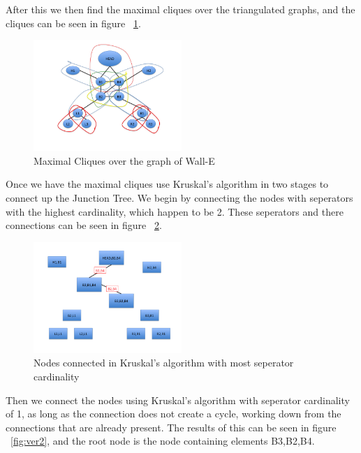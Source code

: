 \documentclass[paper=a4, fontsize=11pt]{scrartcl} %
\begin{document}
After this we then find the maximal cliques over the triangulated graphs, and the cliques can be seen in figure ~\ref{fig:clique}.

\begin{figure}
\centering
\includegraphics[width=0.5\textwidth]{Problem3/Slide3.png}
\caption{Maximal Cliques over the graph of Wall-E}
\label{fig:clique}
\end{figure}

Once we have the maximal cliques use Kruskal's algorithm in two stages to connect up the Junction Tree.  
We begin by connecting the nodes with seperators with the highest cardinality, which happen to be 2.
These seperators and there connections can be seen in figure ~\ref{fig:ver1}.

\begin{figure}
\centering
\includegraphics[width=0.5\textwidth]{Problem3/Slide4.png}
\caption{Nodes connected in Kruskal's algorithm with most seperator cardinality}
\label{fig:ver1}
\end{figure}

Then we connect the nodes using Kruskal's algorithm with seperator cardinality of 1, as long as the connection does not create a cycle, working down from the connections that are already present. 
The results of this can be seen in figure ~\ref{fig:ver2}, and the root node is the node containing elements B3,B2,B4.
\end{document}
